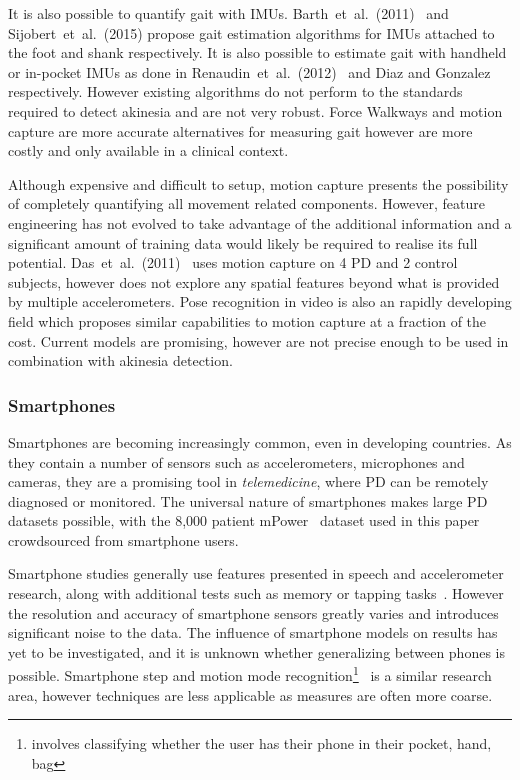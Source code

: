 \documentclass[12pt, twoside]{book}
\renewcommand\emph[1]{\textit{\color{USred}{#1}}}
\begin{document}
It is also possible to quantify gait with IMUs. Barth~et~al.~(2011)~\cite{barth2011biometric} and Sijobert~et~al.~(2015) \cite{sijobert2015implementation} propose gait estimation algorithms for IMUs attached to the foot and shank respectively. It is also possible to estimate gait with handheld or in-pocket IMUs as done in Renaudin~et~al.~(2012)~\cite{renaudin2012step} and Diaz and Gonzalez~\cite{diaz2014step} respectively. However existing algorithms do not perform to the standards required to detect akinesia and are not very robust. Force Walkways and motion capture are more accurate alternatives for measuring gait however are more costly and only available in a clinical context. 

Although expensive and difficult to setup, motion capture presents the possibility of completely quantifying all movement related components. However, feature engineering has not evolved to take advantage of the additional information and a significant amount of training data would likely be required to realise its full potential. Das~et~al.~(2011)~\cite{das2011quantitative} uses motion capture on 4 PD and 2 control subjects, however does not explore any spatial features beyond what is provided by multiple accelerometers. Pose recognition in video is also an rapidly developing field which proposes similar capabilities to motion capture at a fraction of the cost. Current models are promising, however are not precise enough to be used in combination with akinesia detection.

\subsubsection{Smartphones}
Smartphones are becoming increasingly common, even in developing countries. As they contain a number of sensors such as accelerometers, microphones and cameras, they are a promising tool in \textit{telemedicine}, where PD can be remotely diagnosed or monitored. The universal nature of smartphones makes large PD datasets possible, with the 8,000 patient mPower~\cite{mpower} dataset used in this paper crowdsourced from smartphone users.

Smartphone studies generally use features presented in speech and accelerometer research, along with additional tests such as memory or tapping tasks~\cite{tapping}. However the resolution and accuracy of smartphone sensors greatly varies and introduces significant noise to the data. The influence of smartphone models on results has yet to be investigated, and it is unknown whether generalizing between phones is possible. Smartphone step and motion mode recognition\footnote{\emph{Motion mode recognition} involves classifying whether the user has their phone in their pocket, hand, bag  }~\cite{motionmoderecognition, li2010multimodal} is a similar research area, however techniques are less applicable as measures are often more coarse.
\end{document}
